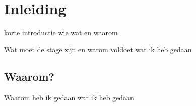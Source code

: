 \chapter{Inleiding}
\label{inleiding}

\begin{center}
    \begin{minipage}{0.5\textwidth}
        \begin{small}
            korte introductie wie wat en waarom
        \end{small}
    \end{minipage}
    \vspace{0.5cm}
\end{center}

\noindent Wat moet de stage zijn en warom voldoet wat ik heb gedaan

\section{Waarom?}

Waarom heb ik gedaan wat ik heb gedaan
